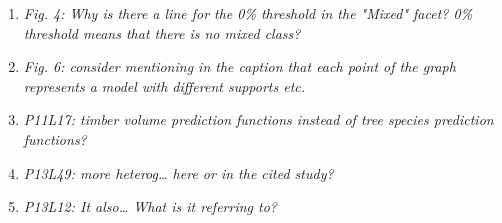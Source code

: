 \documentclass{article}
\begin{document}
\begin{enumerate}
   
	\item \textit{Fig. 4: Why is there a line for the 0\% threshold in the "Mixed" facet? 0\% threshold means that there is no mixed class?   }
	
	\answerfin{}


	\item \textit{Fig. 6: consider mentioning in the caption that each point of the graph represents a model with different supports etc.   }
	
	
	
	\item \textit{P11L17: timber volume prediction functions instead of tree species prediction functions?   }
	
	
	
	\item \textit{P13L49: more heterog… here or in the cited study?   }
	
	
	
	\item \textit{P13L12: It also… What is it referring to?   }
	


\end{enumerate} 
  
\end{document}
